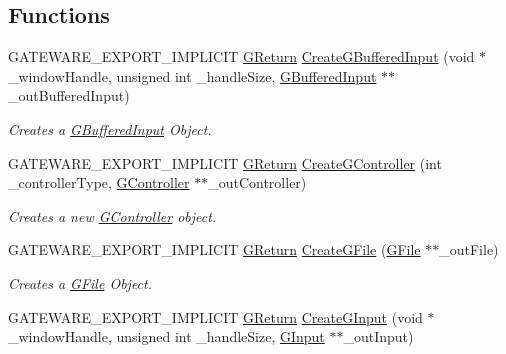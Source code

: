 \subsection*{Functions}
\begin{DoxyCompactItemize}
\item 
G\+A\+T\+E\+W\+A\+R\+E\+\_\+\+E\+X\+P\+O\+R\+T\+\_\+\+I\+M\+P\+L\+I\+C\+IT \mbox{\hyperlink{namespaceGW_a67a839e3df7ea8a5c5686613a7a3de21}{G\+Return}} \mbox{\hyperlink{namespaceGW_1_1SYSTEM_ad32802f3cb2ba314449915b556af4a33}{Create\+G\+Buffered\+Input}} (void $\ast$\+\_\+window\+Handle, unsigned int \+\_\+handle\+Size, \mbox{\hyperlink{classGW_1_1SYSTEM_1_1GBufferedInput}{G\+Buffered\+Input}} $\ast$$\ast$\+\_\+out\+Buffered\+Input)
\begin{DoxyCompactList}\small\item\em Creates a \mbox{\hyperlink{classGW_1_1SYSTEM_1_1GBufferedInput}{G\+Buffered\+Input}} Object. \end{DoxyCompactList}\item 
\mbox{\label{namespaceGW_1_1SYSTEM_a1550dcf674356c9e76ec056ae53526c1}} 
G\+A\+T\+E\+W\+A\+R\+E\+\_\+\+E\+X\+P\+O\+R\+T\+\_\+\+I\+M\+P\+L\+I\+C\+IT \mbox{\hyperlink{namespaceGW_a67a839e3df7ea8a5c5686613a7a3de21}{G\+Return}} \mbox{\hyperlink{namespaceGW_1_1SYSTEM_a1550dcf674356c9e76ec056ae53526c1}{Create\+G\+Controller}} (int \+\_\+controller\+Type, \mbox{\hyperlink{classGW_1_1SYSTEM_1_1GController}{G\+Controller}} $\ast$$\ast$\+\_\+out\+Controller)
\begin{DoxyCompactList}\small\item\em Creates a new \mbox{\hyperlink{classGW_1_1SYSTEM_1_1GController}{G\+Controller}} object. \end{DoxyCompactList}\item 
G\+A\+T\+E\+W\+A\+R\+E\+\_\+\+E\+X\+P\+O\+R\+T\+\_\+\+I\+M\+P\+L\+I\+C\+IT \mbox{\hyperlink{namespaceGW_a67a839e3df7ea8a5c5686613a7a3de21}{G\+Return}} \mbox{\hyperlink{namespaceGW_1_1SYSTEM_a7f850145f185eed4a6aad4f07a2c2a93}{Create\+G\+File}} (\mbox{\hyperlink{classGW_1_1SYSTEM_1_1GFile}{G\+File}} $\ast$$\ast$\+\_\+out\+File)
\begin{DoxyCompactList}\small\item\em Creates a \mbox{\hyperlink{classGW_1_1SYSTEM_1_1GFile}{G\+File}} Object. \end{DoxyCompactList}\item 
G\+A\+T\+E\+W\+A\+R\+E\+\_\+\+E\+X\+P\+O\+R\+T\+\_\+\+I\+M\+P\+L\+I\+C\+IT \mbox{\hyperlink{namespaceGW_a67a839e3df7ea8a5c5686613a7a3de21}{G\+Return}} \mbox{\hyperlink{namespaceGW_1_1SYSTEM_a65ed7fd4a26607544d8477d0bbd02fa7}{Create\+G\+Input}} (void $\ast$\+\_\+window\+Handle, unsigned int \+\_\+handle\+Size, \mbox{\hyperlink{classGW_1_1SYSTEM_1_1GInput}{G\+Input}} $\ast$$\ast$\+\_\+out\+Input)

\end{DoxyCompactItemize}
